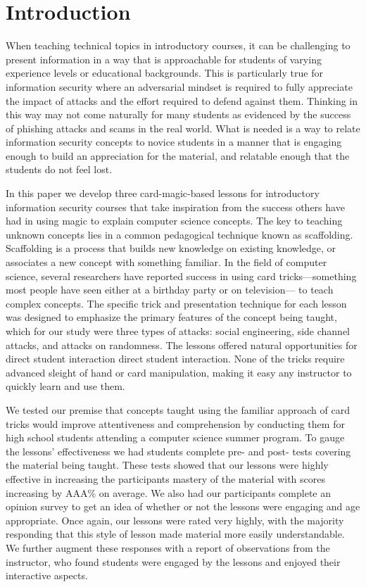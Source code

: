 \section{Introduction}
\label{SEC:introduction}

When teaching technical topics
in introductory courses,
it can be challenging
to present information
in a way that is approachable
for students of varying
experience levels
or educational backgrounds.
This is particularly true
for information security
where an adversarial mindset
is required
to fully appreciate the impact of attacks and the effort required to
defend against them.
Thinking in this way
may not come naturally
for many students
as evidenced
by the success of phishing attacks
and scams in the real world.
What is needed
is a way
to relate information security concepts
to novice students
in a manner
that is engaging enough
to build an appreciation for the material,
and relatable enough that the students do not feel lost.

In this paper
we develop three card-magic-based lessons
for introductory information security courses
that take inspiration
from the success others have had
in using magic
to explain computer science concepts.
The key to teaching unknown concepts
lies in a common pedagogical technique
known as scaffolding.
Scaffolding is a process that builds new knowledge on existing knowledge,
or associates a new concept with something familiar.
In the field of computer science,
several researchers have reported success in using card
tricks—something most people have seen either at a birthday party or on television— to teach complex concepts.
The specific trick and presentation technique
for each lesson was designed to emphasize the primary
features of the concept being taught,
which for our study were three types of attacks:
social engineering,
side channel attacks,
and attacks on randomness.
The lessons offered natural opportunities
for direct student interaction direct student interaction.
None of the tricks require advanced sleight of hand
or card manipulation,
making it easy any instructor to quickly learn and use them.


We tested our premise that concepts taught using the familiar approach
of card tricks would improve attentiveness and comprehension
by conducting them for high school students
attending a computer science summer program.
To gauge the lessons'
effectiveness we had students complete pre- and post- tests covering the
material being taught.  These tests showed that our lessons were highly
effective in increasing the participants mastery of the material with scores
increasing by AAA\% on average.
We also had our participants complete an opinion survey to get an idea of
whether or not the lessons were engaging and age appropriate.  Once again, our
lessons were rated very highly,
with the majority responding that this style of lesson made material
more easily understandable.
We further augment these responses
with a report of observations
from the instructor,
who found students were engaged by the lessons and enjoyed their interactive
aspects.


